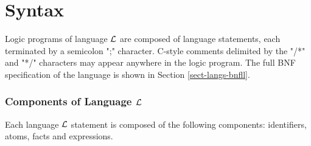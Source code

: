 \documentclass[11pt]{report}
\begin{document}
    \section{Syntax}
      \label{sect-langl-syntx}

      Logic programs of language ${\cal L}$ are composed of language
      statements, each terminated by a semicolon ";" character. C-style
      comments delimited by the "/*" and "*/" characters may appear anywhere
      in the logic program. The full BNF specification of the language is
      shown in Section \ref{sect-langs-bnfll}.

      \subsubsection{Components of Language $\cal{L}$}
        \label{subs-langl-compo}

        Each language ${\cal L}$ statement is composed of the following
        components: identifiers, atoms, facts and expressions.
\end{document}
